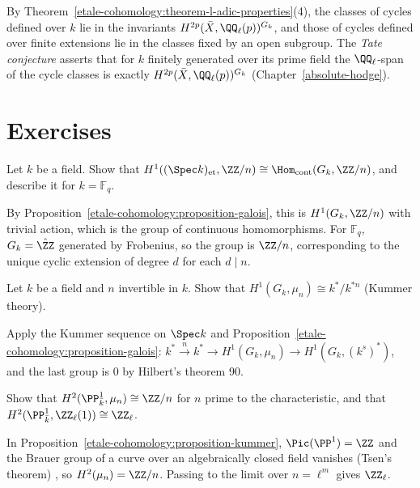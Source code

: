 \begin{remark}\label{etale-cohomology:remark-tate}
By Theorem~\ref{etale-cohomology:theorem-l-adic-properties}(4), the classes of cycles defined over $k$ lie in the invariants $H^{2p}(\bar X, \QQ_\ell(p))^{G_k}$, and those of cycles defined over finite
extensions lie in the classes fixed by an open subgroup. The \emph{Tate conjecture} asserts that for $k$ finitely generated over its prime field the $\QQ_\ell$-span of the cycle classes is exactly
$H^{2p}(\bar X, \QQ_\ell(p))^{G_k}$ (Chapter~\ref{absolute-hodge}).
\end{remark}

\section{Exercises}\label{etale-cohomology:section-exercises}

\begin{exercise}\label{etale-cohomology:exercise-h1-z-mod-n}
Let $k$ be a field. Show that $H^1((\Spec k)_{\mathrm{et}}, \ZZ/n) \cong \Hom_{\mathrm{cont}}(G_k, \ZZ/n)$, and describe it for $k = \mathbb{F}_q$.
\end{exercise}

\begin{solution}
By Proposition~\ref{etale-cohomology:proposition-galois}, this is $H^1(G_k, \ZZ/n)$ with trivial action, which is the group of continuous homomorphisms. For $\mathbb{F}_q$, $G_k = \hat{\ZZ}$
generated by Frobenius, so the group is $\ZZ/n$, corresponding to the unique cyclic extension of degree $d$ for each $d \mid n$.
\end{solution}

\begin{exercise}\label{etale-cohomology:exercise-kummer-field}
Let $k$ be a field and $n$ invertible in $k$. Show that $H^1(G_k, \mu_n) \cong k^*/k^{*n}$ (Kummer theory).
\end{exercise}

\begin{solution}
Apply the Kummer sequence on $\Spec k$ and Proposition~\ref{etale-cohomology:proposition-galois}: $k^* \xrightarrow{n} k^* \to H^1(G_k, \mu_n) \to H^1(G_k, (k^s)^*)$, and the last group is $0$ by Hilbert's
theorem 90.
\end{solution}

\begin{exercise}\label{etale-cohomology:exercise-projective-line}
Show that $H^2(\PP^1_{\bar k}, \mu_n) \cong \ZZ/n$ for $n$ prime to the characteristic, and that $H^2(\PP^1_{\bar k}, \ZZ_\ell(1)) \cong \ZZ_\ell$.
\end{exercise}

\begin{solution}
In Proposition~\ref{etale-cohomology:proposition-kummer}, $\Pic(\PP^1) = \ZZ$ and the Brauer group of a curve over an algebraically closed field vanishes (Tsen's theorem)
\cite[Chapter III]{milne-etale}, so $H^2(\mu_n) = \ZZ/n$. Passing to the limit over $n = \ell^m$ gives $\ZZ_\ell$.
\end{solution}
